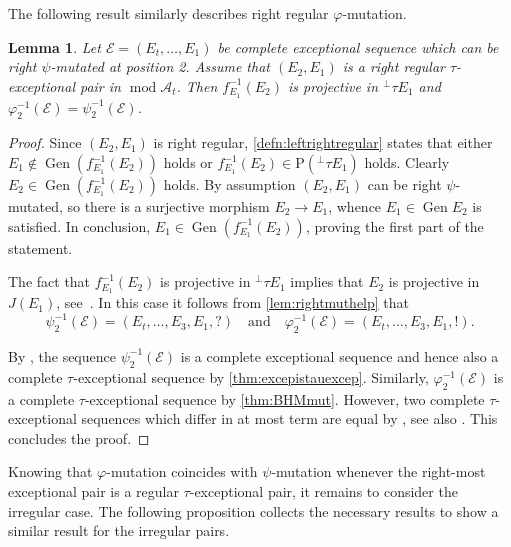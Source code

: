 \documentclass[10pt,twoside, a4paper,reqno]{amsart}
\DeclareMathOperator{\mods}{mod}
\DeclareMathOperator{\Gen}{Gen}
\newcommand{\A}{\mathscr{A}}
\newcommand{\Ecal}{\mathcal{E}}
\newcommand{\Prm}{\mathrm{P}}
\newtheorem{lemma}[theorem]{Lemma}
\theoremstyle{definition}
\begin{document}
The following result similarly describes right regular $\varphi$-mutation. 

\begin{lemma}\label{lem:rightirrcounter}
    Let $\Ecal= (E_t, \dots, E_1)$ be complete exceptional sequence which can be right $\psi$-mutated at position 2. Assume that $(E_2, E_1)$ is a right regular $\tau$-exceptional pair in $\mods \A_t$. Then $f_{E_1}^{-1}(E_2)$ is projective in ${}^\perp \tau E_1$ and $\varphi_{2}^{-1}(\Ecal) = \psi_{2}^{-1}(\Ecal)$.
\end{lemma}
\begin{proof}
    Since $(E_2, E_1)$ is right regular, \cref{defn:leftrightregular} states that either $E_1 \not \in \Gen(f_{E_1}^{-1}(E_2))$ holds or $f_{E_1}^{-1}(E_2) \in \Prm({}^\perp \tau E_1)$ holds. Clearly $E_2 \in \Gen (f_{E_1}^{-1}(E_2))$ holds. By assumption $(E_2, E_1)$ can be right $\psi$-mutated, so there is a surjective morphism $E_2 \to E_1$, whence $E_1 \in \Gen E_2$ is satisfied. In conclusion, $E_1 \in \Gen (f_{E_1}^{-1}(E_2))$, proving the first part of the statement.

    The fact that $f_{E_1}^{-1}(E_2)$ is projective in ${}^\perp \tau E_1$ implies that $E_2$ is projective in $J(E_1)$, see \cite[Lem. 2.17]{BHM2024}. In this case it follows from \cref{lem:rightmuthelp} that
    \[ \psi_{2}^{-1}(\Ecal) = (E_t, \dots, E_3, E_1, ?) \quad \text{and} \quad \varphi_{2}^{-1}(\Ecal) = (E_t, \dots, E_3,E_1, !).\]

    By \cite[Lem. 4.7, Cor. 4.8]{HillePloog2019}, the sequence $\psi_{2}^{-1}(\Ecal)$ is a complete exceptional sequence and hence also a complete $\tau$-exceptional sequence by \cref{thm:excepistauexcep}. Similarly, $\varphi_{2}^{-1}(\Ecal)$ is a complete $\tau$-exceptional sequence by \cref{thm:BHMmut}. However, two complete $\tau$-exceptional sequences which differ in at most term are equal by \cite[Thm. 2.1(a)]{BuanMarsh2023}, see also \cite[Thm. 8]{HansonThomas2024}. This concludes the proof.
\end{proof}

Knowing that $\varphi$-mutation coincides with $\psi$-mutation whenever the right-most exceptional pair is a regular $\tau$-exceptional pair, it remains to consider the irregular case. The following proposition collects the necessary results to show a similar result for the irregular pairs. 
\end{document}
